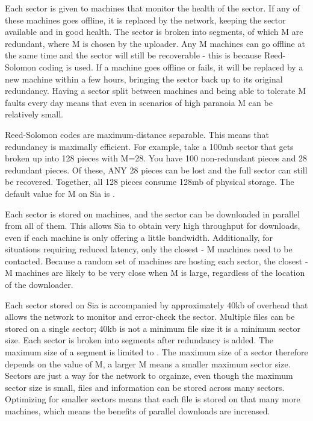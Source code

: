 \documentclass[twocolumn]{article}
\begin{document}
Each sector is given to \quorumsize{} machines that monitor the health of the sector.
If any of these machines goes offline, it is replaced by the network, keeping the sector available and in good health.
The sector is broken into \quorumsize{} segments, of which M are redundant, where M is chosen by the uploader.
Any M machines can go offline at the same time and the sector will still be recoverable - this is because Reed-Solomon coding is used.
If a machine goes offline or fails, it will be replaced by a new machine within a few hours, bringing the sector back up to its original redundancy.
Having a sector split between \quorumsize{} machines and being able to tolerate M faults every day means that even in scenarios of high paranoia M can be relatively small.

Reed-Solomon codes are maximum-distance separable.
This means that redundancy is maximally efficient.
For example, take a 100mb sector that gets broken up into 128 pieces with M=28.
You have 100 non-redundant pieces and 28 redundant pieces.
Of these, ANY 28 pieces can be lost and the full sector can still be recovered.
Together, all 128 pieces consume 128mb of physical storage.
The default value for M on Sia is .

Each sector is stored on \quorumsize{} machines, and the sector can be downloaded in parallel from all of them.
This allows Sia to obtain very high throughput for downloads, even if each machine is only offering a little bandwidth.
Additionally, for situations requiring reduced latency, only the closest \quorumsize{} - M machines need to be contacted.
Because a random set of machines are hosting each sector, the closest \quorumsize{} - M machines are likely to be very close when M is large, regardless of the location of the downloader.

Each sector stored on Sia is accompanied by approximately 40kb of overhead that allows the network to monitor and error-check the sector.
Multiple files can be stored on a single sector; 40kb is not a minimum file size it is a minimum sector size.
Each sector is broken into \quorumsize{} segments after redundancy is added.
The maximum size of a segment is limited to \maxsegmentsize.
The maximum size of a sector therefore depends on the value of M, a larger M means a smaller maximum sector size.
Sectors are just a way for the network to orgainze, even though the maximum sector size is small, files and information can be stored across many sectors.
Optimizing for smaller sectors means that each file is stored on that many more machines, which means the benefits of parallel downloads are increased.
\end{document}

